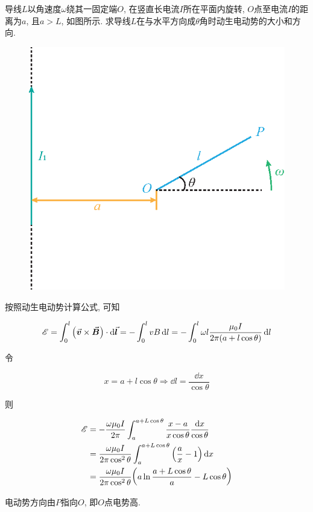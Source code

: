 \begin{example}
	导线$L$以角速度$\omega$绕其一固定端$O$, 在竖直长电流$I$所在平面内旋转, $O$点至电流$I$的距离为$a$, 且$a>L$, 如图所示. 求导线$L$在与水平方向成$\theta$角时动生电动势的大小和方向. 
	
	\begin{figure}[H]
		\centering
		\includegraphics[scale=0.7]{C9-fig3.eps}
	\end{figure}
	
	\begin{solution}
		
		按照动生电动势计算公式, 可知
		
		\begin{equation*}
			\mathscr{E} = \int_{0}^{l} \qty(\va*{v} \times \va*{B}) \cdot \dd{\va*{l}} = - \int_{0}^{l} vB \dd{l} = - \int_{0}^{l} \omega l \dfrac{\mu_0 I}{2 \pi \qty(a + l \cos \theta)} \dd{l}
		\end{equation*}
		
		令
		
		\begin{equation*}
			x = a + l \cos\theta \Rightarrow \dd{l} = \dfrac{\dd{x}}{\cos \theta}
		\end{equation*}
		
		则
		
		\begin{align*}
			\mathscr{E} &= - \dfrac{\omega \mu_0 I}{2 \pi} \int_{a}^{a+L\cos\theta} \dfrac{x-a}{x\cos\theta} \dfrac{\dd{x}}{\cos \theta} \\
			&= \dfrac{\omega \mu_0 I}{2 \pi \cos^2 \theta} \int_{a}^{a+L\cos\theta} \qty(\dfrac{a}{x} - 1) \dd{x} \\
			&= \dfrac{\omega \mu_0 I}{2 \pi \cos^2 \theta} \qty(a \ln 
			\dfrac{a+L\cos\theta}{a} - L \cos\theta)
		\end{align*}
		
		电动势方向由$P$指向$O$, 即$O$点电势高. 
		
	\end{solution}
	
\end{example}

